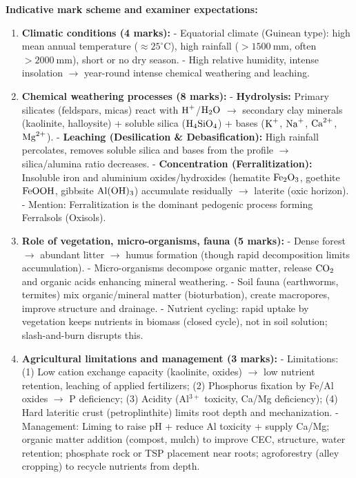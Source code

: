 \documentclass[11pt]{article}
\begin{document}
\begin{corrige}
\textbf{Indicative mark scheme and examiner expectations:}
\begin{enumerate}
\item \textbf{Climatic conditions (4 marks):}  
  - Equatorial climate (Guinean type): high mean annual temperature ($\approx 25^\circ\mathrm{C}$), high rainfall ($>1500\ \mathrm{mm}$, often $>2000\ \mathrm{mm}$), short or no dry season.  
  - High relative humidity, intense insolation $\to$ year-round intense chemical weathering and leaching.

\item \textbf{Chemical weathering processes (8 marks):}  
  - \textbf{Hydrolysis:} Primary silicates (feldspars, micas) react with $\ce{H+}$/$\ce{H2O}$ $\to$ secondary clay minerals (kaolinite, halloysite) + soluble silica ($\ce{H4SiO4}$) + bases ($\ce{K+}$, $\ce{Na+}$, $\ce{Ca^2+}$, $\ce{Mg^2+}$).  
  - \textbf{Leaching (Desilication \& Debasification):} High rainfall percolates, removes soluble silica and bases from the profile $\to$ silica/alumina ratio decreases.  
  - \textbf{Concentration (Ferralitization):} Insoluble iron and aluminium oxides/hydroxides (hematite $\ce{Fe2O3}$, goethite $\ce{FeOOH}$, gibbsite $\ce{Al(OH)3}$) accumulate residually $\to$ laterite (oxic horizon).  
  - Mention: Ferralitization is the dominant pedogenic process forming Ferralsols (Oxisols).

\item \textbf{Role of vegetation, micro-organisms, fauna (5 marks):}  
  - Dense forest $\to$ abundant litter $\to$ humus formation (though rapid decomposition limits accumulation).  
  - Micro-organisms decompose organic matter, release $\ce{CO2}$ and organic acids enhancing mineral weathering.  
  - Soil fauna (earthworms, termites) mix organic/mineral matter (bioturbation), create macropores, improve structure and drainage.  
  - Nutrient cycling: rapid uptake by vegetation keeps nutrients in biomass (closed cycle), not in soil solution; slash-and-burn disrupts this.

\item \textbf{Agricultural limitations and management (3 marks):}  
  - Limitations: (1) Low cation exchange capacity (kaolinite, oxides) $\to$ low nutrient retention, leaching of applied fertilizers; (2) Phosphorus fixation by Fe/Al oxides $\to$ P deficiency; (3) Acidity (Al$^{3+}$ toxicity, Ca/Mg deficiency); (4) Hard lateritic crust (petroplinthite) limits root depth and mechanization.  
  - Management: Liming to raise pH + reduce Al toxicity + supply Ca/Mg; organic matter addition (compost, mulch) to improve CEC, structure, water retention; phosphate rock or TSP placement near roots; agroforestry (alley cropping) to recycle nutrients from depth.
\end{enumerate}
\end{corrige}
\end{document}
